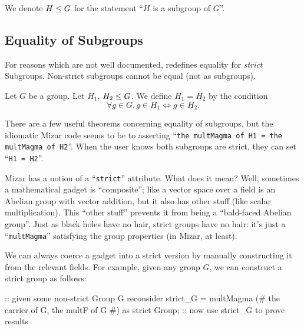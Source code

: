 \begin{notation}
We denote $H\leq G$ for the statement ``$H$ is a subgroup of $G$''.
\end{notation}

\subsection{Equality of Subgroups}\label{par:introduction:subgroup-equality}
For reasons which are not well documented, 
redefines equality for \emph{strict} Subgroups. Non-strict subgroups
cannot be equal (not as subgroups).

\begin{definition}
Let $G$ be a group.
Let $H_{1}$, $H_{2}\leq G$.
We define  $H_{1}=H_{2}$ by the condition
\begin{equation}
\forall g\in G, g\in H_{1}\iff g\in H_{2}.
\end{equation}
\end{definition}

\bigbreak

There are a few useful theorems concerning equality of subgroups, but
the idiomatic Mizar code seems to be to asserting
``\lstinline[breaklines=true]{the multMagma of H1 = the multMagma of H2}''.
When the user knows both subgroups are strict, they can set ``\lstinline{H1 = H2}''.



\begin{aside}
Mizar has a notion of a ``\lstinline{strict}'' attribute. What does it mean?
Well, sometimes a mathematical gadget is ``composite''; like a vector
space over a field is an Abelian group with vector addition, but it also
has other stuff (like scalar multiplication). This ``other stuff''
prevents it from being a ``bald-faced Abelian group''. Just as black
holes have no hair, strict groups have no hair: it's just a
``\lstinline{multMagma}'' satisfying the group properties (in Mizar, at
least).

We can always coerce a gadget into a strict version by manually
constructing it from the relevant fields. For example, given any group
$G$, we can construct a strict group as follows:
\begin{mizar}
:: given some non-strict Group G
reconsider strict_G = multMagma (# the carrier of G,
  the multF of G #) as strict Group;
:: now use strict_G to prove results
\end{mizar}
\end{aside}

